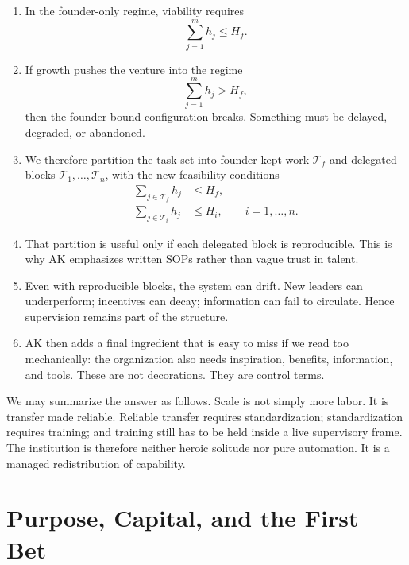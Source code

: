 \begin{enumerate}
\item In the founder-only regime, viability requires
\begin{equation}
\sum_{j=1}^{m} h_j \le H_f.
\end{equation}

\item If growth pushes the venture into the regime
\begin{equation}
\sum_{j=1}^{m} h_j > H_f,
\end{equation}
then the founder-bound configuration breaks. Something must be delayed, degraded, or abandoned.

\item We therefore partition the task set into founder-kept work \(\mathcal{T}_f\) and delegated blocks \(\mathcal{T}_1,\dots,\mathcal{T}_n\), with the new feasibility conditions
\begin{align}
\sum_{j \in \mathcal{T}_f} h_j &\le H_f,\\
\sum_{j \in \mathcal{T}_i} h_j &\le H_i, \qquad i=1,\dots,n.
\end{align}

\item That partition is useful only if each delegated block is reproducible. This is why AK emphasizes written \(\mathrm{SOP}\)s rather than vague trust in talent.

\item Even with reproducible blocks, the system can drift. New leaders can underperform; incentives can decay; information can fail to circulate. Hence supervision remains part of the structure.

\item AK then adds a final ingredient that is easy to miss if we read too mechanically: the organization also needs inspiration, benefits, information, and tools. These are not decorations. They are control terms.
\end{enumerate}

We may summarize the answer as follows. Scale is not simply more labor. It is transfer made reliable. Reliable transfer requires standardization; standardization requires training; and training still has to be held inside a live supervisory frame. The institution is therefore neither heroic solitude nor pure automation. It is a managed redistribution of capability.

\section{Purpose, Capital, and the First Bet}

